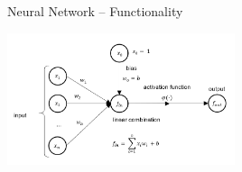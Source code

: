 \documentclass[11pt,compress,t,notes=noshow, xcolor=table]{beamer}
\begin{document}
\begin{frame}{Neural Network -- Functionality}
% 
% 

\medskip
  \centering
  \includegraphics[width=0.5\textwidth]{figure/nn_neuron.PNG}

\end{frame}

\end{document}
